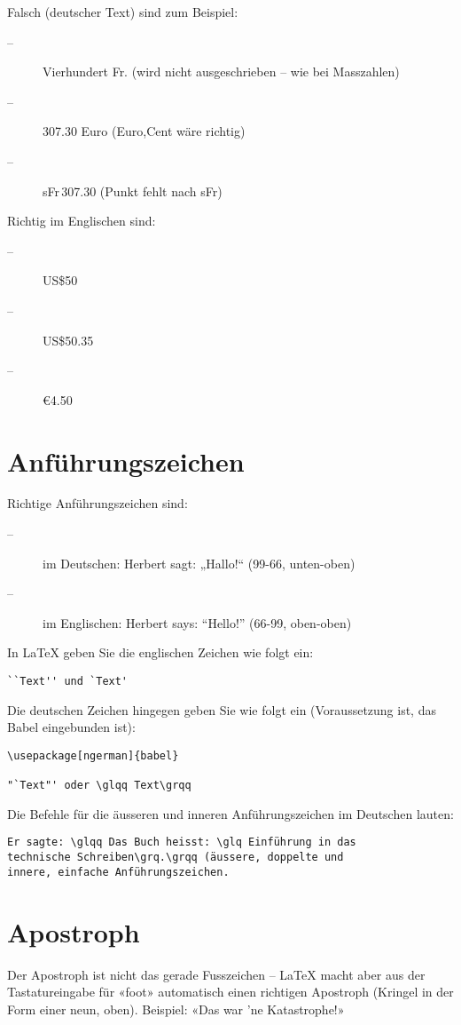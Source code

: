 Falsch (deutscher Text) sind zum Beispiel:
\begin{description}
  \item[--] Vierhundert Fr. (wird nicht ausgeschrieben -- wie bei Masszahlen)
  \item[--] 307.30 Euro (Euro,Cent wäre richtig)
  \item[--] sFr\,307.30 (Punkt fehlt nach sFr)
\end{description}

Richtig im Englischen sind:
\begin{description}
  \item[--] US\$50
  \item[--] US\$50.35
  \item[--] €4.50
\end{description}

\section{Anführungszeichen}

Richtige Anführungszeichen sind:
\begin{description}
  \item[--] im Deutschen: Herbert sagt: „Hallo!“ (99-66, unten-oben)
  \item[--] im Englischen: Herbert says: ``Hello!'' (66-99, oben-oben)
\end{description}

In LaTeX geben Sie die englischen Zeichen wie folgt ein:
\begin{verbatim}
``Text'' und `Text'
\end{verbatim}

Die deutschen Zeichen hingegen geben Sie wie folgt ein (Voraussetzung ist, das Babel eingebunden ist):
\begin{verbatim}
\usepackage[ngerman]{babel}

"`Text"' oder \glqq Text\grqq
\end{verbatim}

Die Befehle für die äusseren und inneren Anführungszeichen im Deutschen lauten:
\begin{verbatim}
Er sagte: \glqq Das Buch heisst: \glq Einführung in das 
technische Schreiben\grq.\grqq (äussere, doppelte und 
innere, einfache Anführungszeichen.
\end{verbatim}

\section{Apostroph}

Der Apostroph ist nicht das gerade Fusszeichen – LaTeX macht aber aus der Tastatur\-eingabe für «foot» automatisch einen richtigen Apostroph (Kringel in der Form einer neun, oben). \hfill \break
Beispiel: «Das war 'ne Katastrophe!»